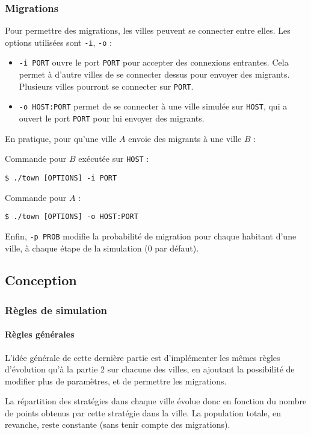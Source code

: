 \documentclass[10pt]{article}
\begin{document}
\subsubsection{Migrations}
Pour permettre des migrations, les villes peuvent se connecter entre elles.
Les options utilisées sont \verb|-i|, \verb|-o| :
\begin{itemize}
\item \verb|-i PORT| ouvre le port \verb|PORT| pour accepter des connexions entrantes. 
      Cela permet à d'autre villes de se connecter dessus pour envoyer des migrants.
      Plusieurs villes pourront se connecter sur \verb|PORT|.
\item \verb|-o HOST:PORT| permet de se connecter à une ville simulée sur \verb|HOST|, qui
      a ouvert le port \verb|PORT| pour lui envoyer des migrants.
\end{itemize}

En pratique, pour qu'une ville $A$ envoie des migrants à une ville $B$ :

Commande pour $B$ exécutée sur \verb|HOST| :
\begin{verbatim}
$ ./town [OPTIONS] -i PORT
\end{verbatim}

Commande pour $A$ :
\begin{verbatim}
$ ./town [OPTIONS] -o HOST:PORT
\end{verbatim}

Enfin, \verb|-p PROB| modifie la probabilité de migration pour chaque habitant d'une ville,
à chaque étape de la simulation (0 par défaut).


\subsection{Conception}
\subsubsection{Règles de simulation}
\paragraph{Règles générales}
L'idée générale de cette dernière partie est d'implémenter les mêmes règles d'évolution qu'à la partie 2 sur chacune des villes,
en ajoutant la possibilité de modifier plus de paramètres, et de permettre les migrations.

La répartition des stratégies dans chaque ville évolue donc en fonction du nombre de points obtenus par cette stratégie dans la ville.
La population totale, en revanche, reste constante (sans tenir compte des migrations).
\end{document}
